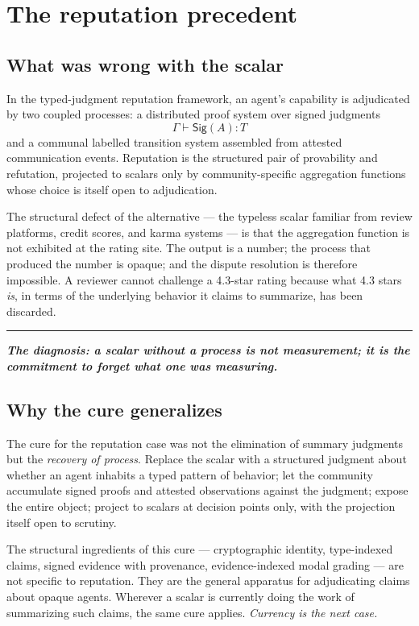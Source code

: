 \documentclass[11pt]{article}
\newcommand{\position}[1]{%
  \medskip
  \begin{quoting}[indentfirst=false, leftmargin=1em, rightmargin=1em]
  \noindent\textcolor{rhosky}{\rule{3pt}{1.2em}}\hspace{0.5em}\textbf{\textit{#1}}
  \end{quoting}
  \medskip
}
\newcommand{\Sig}{\mathsf{Sig}}
\begin{document}
\section{The reputation precedent}

\subsection{What was wrong with the scalar}

In the typed-judgment reputation framework, an agent's capability is adjudicated by two coupled processes: a distributed proof system over signed judgments
\[
\Gamma \vdash \Sig(A) : T
\]
and a communal labelled transition system assembled from attested communication events. Reputation is the structured pair of provability and refutation, projected to scalars only by community-specific aggregation functions whose choice is itself open to adjudication.

The structural defect of the alternative --- the typeless scalar familiar from review platforms, credit scores, and karma systems --- is that the aggregation function is not exhibited at the rating site. The output is a number; the process that produced the number is opaque; and the dispute resolution is therefore impossible. A reviewer cannot challenge a 4.3-star rating because what 4.3 stars \emph{is}, in terms of the underlying behavior it claims to summarize, has been discarded.

\position{The diagnosis: a scalar without a process is not measurement; it is the commitment to forget what one was measuring.}

\subsection{Why the cure generalizes}

The cure for the reputation case was not the elimination of summary judgments but the \emph{recovery of process}. Replace the scalar with a structured judgment about whether an agent inhabits a typed pattern of behavior; let the community accumulate signed proofs and attested observations against the judgment; expose the entire object; project to scalars at decision points only, with the projection itself open to scrutiny.

The structural ingredients of this cure --- cryptographic identity, type-indexed claims, signed evidence with provenance, evidence-indexed modal grading --- are not specific to reputation. They are the general apparatus for adjudicating claims about opaque agents. Wherever a scalar is currently doing the work of summarizing such claims, the same cure applies. \emph{Currency is the next case.}
\end{document}
